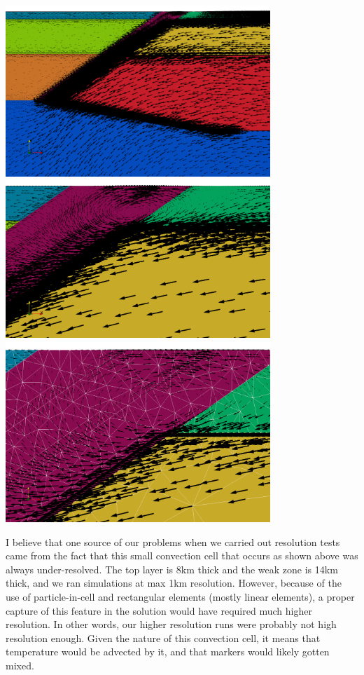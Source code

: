 \newpage
\begin{center}
\includegraphics[width=10cm]{python_codes/fieldstone_62/results/vel2}\\
\includegraphics[width=10cm]{python_codes/fieldstone_62/results/vel3}\\
\includegraphics[width=10cm]{python_codes/fieldstone_62/results/vel4}
\end{center}

I believe that one source of our problems when we carried out resolution tests
came from the fact that this small convection cell that occurs as shown above was
always under-resolved. The top layer is 8km thick and the weak zone is 14km thick,
and we ran simulations at max 1km resolution. However, because of the use  
of particle-in-cell and rectangular elements (mostly linear elements), 
a proper capture of this feature in the solution would have required much higher 
resolution. In other words, our higher resolution runs were probably not high resolution enough.
Given the nature of this convection cell, it means that temperature would be advected by it, 
and that markers would likely gotten mixed. 




